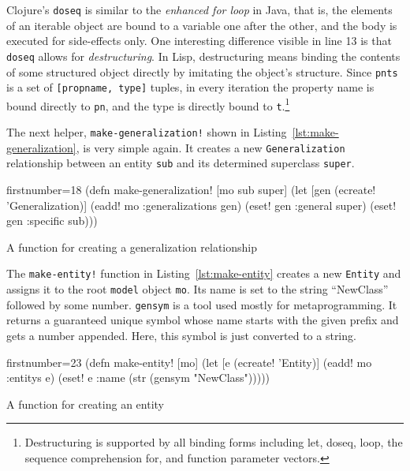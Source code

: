 \documentclass[11pt]{article}
\begin{document}
Clojure's \verb|doseq| is similar to the \emph{enhanced for loop} in Java, that
is, the elements of an iterable object are bound to a variable one after the
other, and the body is executed for side-effects only.  One interesting
difference visible in line 13 is that \verb|doseq| allows for
\emph{destructuring}.  In Lisp, destructuring means binding the contents of
some structured object directly by imitating the object's structure.  Since
\verb|pnts| is a set of \verb|[propname, type]| tuples, in every iteration the
property name is bound directly to \verb|pn|, and the type is directly bound to
\verb|t|.\footnote{Destructuring is supported by all binding forms including
  \textsf{let}, \textsf{doseq}, \textsf{loop}, the sequence comprehension
  \textsf{for}, and function parameter vectors.}

The next helper, \verb|make-generalization!| shown in
Listing~\ref{lst:make-generalization}, is very simple again.  It creates a new
\verb|Generalization| relationship between an entity \verb|sub| and its
determined superclass \verb|super|.

\begin{listing}[htbp]
  \begin{clojurecode*}{firstnumber=18}
(defn make-generalization! [mo sub super]
  (let [gen (ecreate! 'Generalization)]
    (eadd! mo :generalizations gen)
    (eset! gen :general super)
    (eset! gen :specific sub)))
  \end{clojurecode*}
  \caption{A function for creating a generalization relationship}
  \label{lst:make-generalization}
\end{listing}

The \verb|make-entity!| function in Listing~\ref{lst:make-entity} creates a new
\verb|Entity| and assigns it to the root \verb|model| object \verb|mo|.  Its
name is set to the string ``NewClass'' followed by some number.  \verb|gensym|
is a tool used mostly for metaprogramming.  It returns a guaranteed unique
symbol whose name starts with the given prefix and gets a number appended.
Here, this symbol is just converted to a string.

\begin{listing}[htbp]
  \begin{clojurecode*}{firstnumber=23}
(defn make-entity! [mo]
  (let [e (ecreate! 'Entity)]
    (eadd! mo :entitys e)
    (eset! e :name (str (gensym "NewClass")))))
  \end{clojurecode*}
  \caption{A function for creating an entity}
  \label{lst:make-entity}
\end{listing}
\end{document}
